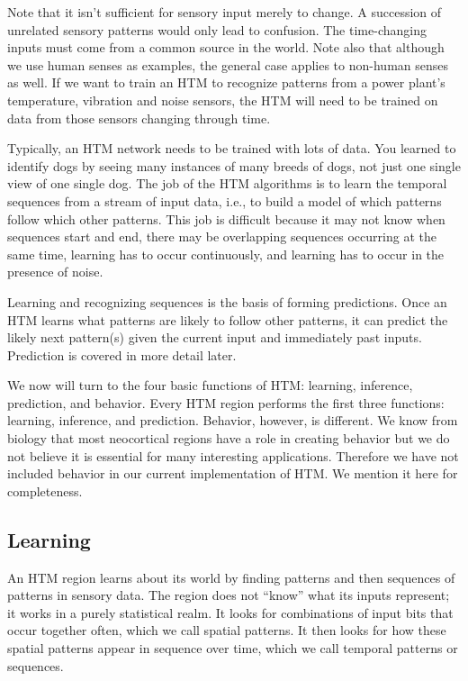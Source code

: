 \documentclass{report}
\begin{document}
Note that it isn't sufficient for sensory input merely to change. A
succession of unrelated sensory patterns would only lead to
confusion. The time-changing inputs must come from a common source in
the world. Note also that although we use human senses as examples,
the general case applies to non-human senses as well. If we want to
train an HTM to recognize patterns from a power plant's temperature,
vibration and noise sensors, the HTM will need to be trained on data
from those sensors changing through time.

Typically, an HTM network needs to be trained with lots of data. You
learned to identify dogs by seeing many instances of many breeds of
dogs, not just one single view of one single dog. The job of the HTM
algorithms is to learn the temporal sequences from a stream of input
data, i.e., to build a model of which patterns follow which other
patterns. This job is difficult because it may not know when sequences
start and end, there may be overlapping sequences occurring at the
same time, learning has to occur continuously, and learning has to
occur in the presence of noise.

Learning and recognizing sequences is the basis of forming
predictions. Once an HTM learns what patterns are likely to follow
other patterns, it can predict the likely next pattern(s) given the
current input and immediately past inputs. Prediction is covered in
more detail later.

We now will turn to the four basic functions of HTM: learning,
inference, prediction, and behavior. Every HTM region performs the
first three functions: learning, inference, and prediction. Behavior,
however, is different. We know from biology that most neocortical
regions have a role in creating behavior but we do not believe it is
essential for many interesting applications. Therefore we have not
included behavior in our current implementation of HTM. We mention it
here for completeness.

\subsection*{Learning}

An HTM region learns about its world by finding patterns and then
sequences of patterns in sensory data. The region does not ``know''
what its inputs represent; it works in a purely statistical realm. It
looks for combinations of input bits that occur together often, which
we call spatial patterns. It then looks for how these spatial patterns
appear in sequence over time, which we call temporal patterns or
sequences.
\end{document}
